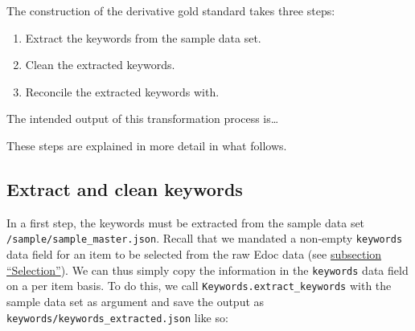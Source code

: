 The construction of the derivative gold standard takes three steps:

\begin{enumerate}
\def\labelenumi{\arabic{enumi}.}
\tightlist
\item
  Extract the keywords from the sample data set.
\item
  Clean the extracted keywords.
\item
  Reconcile the extracted keywords with.
\end{enumerate}

The intended output of this transformation process is\ldots{}

These steps are explained in more detail in what follows.

\hypertarget{extract-and-clean-keywords}{%
\subsection{Extract and clean
keywords}\label{extract-and-clean-keywords}}

In a first step, the keywords must be extracted from the sample data set
\texttt{/sample/sample\_master.json}. Recall that we mandated a
non-empty \texttt{keywords} data field for an item to be selected from
the raw Edoc data (see \protect\hyperlink{selection}{subsection
``Selection''}). We can thus simply copy the information in the
\texttt{keywords} data field on a per item basis. To do this, we call
\texttt{Keywords.extract\_keywords} with the sample data set as argument
and save the output as \texttt{keywords/keywords\_extracted.json} like
so:

\begin{Shaded}
\begin{Highlighting}[]
\OperatorTok{=}\OperatorTok{+} \NormalTok{)}
\OperatorTok{+} \NormalTok{)}
\end{Highlighting}
\end{Shaded}


